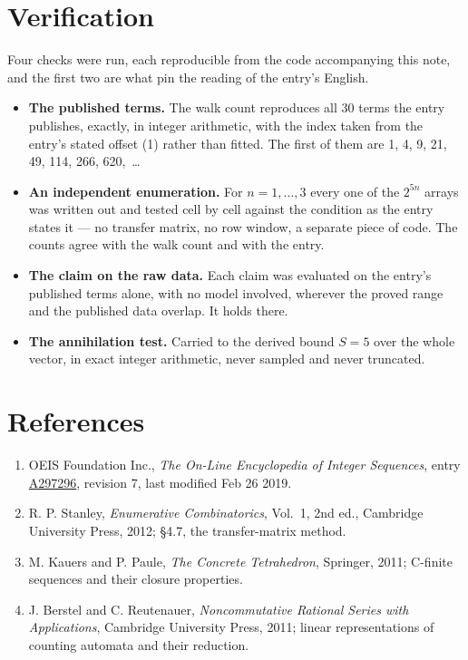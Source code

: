 \documentclass[11pt]{article}
\theoremstyle{definition}
\begin{document}
\section{Verification}

Four checks were run, each reproducible from the code accompanying this note, and the first two are what pin the reading of the entry's English.

\begin{itemize}

\item {\bfseries The published terms.} The walk count reproduces all 30 terms the entry publishes, exactly, in integer arithmetic, with the index taken from the entry's stated offset (1) rather than fitted. The first of them are 1, 4, 9, 21, 49, 114, 266, 620,~\dots

\item {\bfseries An independent enumeration.} For $n = 1,\dots,3$ every one of the $2^{5n}$ arrays was written out and tested cell by cell against the condition as the entry states it --- no transfer matrix, no row window, a separate piece of code. The counts agree with the walk count and with the entry.

\item {\bfseries The claim on the raw data.} Each claim was evaluated on the entry's published terms alone, with no model involved, wherever the proved range and the published data overlap. It holds there.

\item {\bfseries The annihilation test.} Carried to the derived bound $S = 5$ over the whole vector, in exact integer arithmetic, never sampled and never truncated.

\end{itemize}

\section{References}

\begin{enumerate}

\item OEIS Foundation Inc., \emph{The On-Line Encyclopedia of Integer Sequences}, entry \href{https://oeis.org/A297296}{A297296}, revision 7, last modified Feb 26 2019.

\item R. P. Stanley, \emph{Enumerative Combinatorics}, Vol.~1, 2nd ed., Cambridge University Press, 2012; \S4.7, the transfer-matrix method.

\item M. Kauers and P. Paule, \emph{The Concrete Tetrahedron}, Springer, 2011; C-finite sequences and their closure properties.

\item J. Berstel and C. Reutenauer, \emph{Noncommutative Rational Series with Applications}, Cambridge University Press, 2011; linear representations of counting automata and their reduction.

\end{enumerate}
\end{document}
